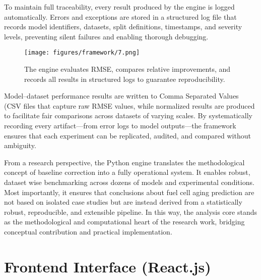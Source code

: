 \enlargethispage{\baselineskip}


To maintain full traceability, every result produced by the engine is logged automatically. Errors and exceptions are stored in a structured log file that records model identifiers, datasets, split definitions, timestamps, and severity levels, preventing silent failures and enabling thorough debugging.
\begin{figure}[H]
\centering
 \texttt{[image: figures/framework/7.png]}
 \caption[Performance evaluation, logging, and reproducibility pipeline.]{The engine evaluates RMSE, compares relative improvements, and records all results in structured logs to guarantee reproducibility.}
 \label{fig:performance_evaluation}
\end{figure}
Model–dataset performance results are written to Comma Separated Values (CSV files that capture raw RMSE values, while normalized results are produced to facilitate fair comparisons across datasets of varying scales. By systematically recording every artifact—from error logs to model outputs—the framework ensures that each experiment can be replicated, audited, and compared without ambiguity. 


From a research perspective, the Python engine translates the methodological concept of baseline correction into a fully operational system. It enables robust, dataset wise benchmarking across dozens of models and experimental conditions. Most importantly, it ensures that conclusions about fuel cell aging prediction are not based on isolated case studies but are instead derived from a statistically robust, reproducible, and extensible pipeline. In this way, the analysis core stands as the methodological and computational heart of the research work, bridging conceptual contribution and practical implementation.

\section{Frontend Interface (React.js)}

